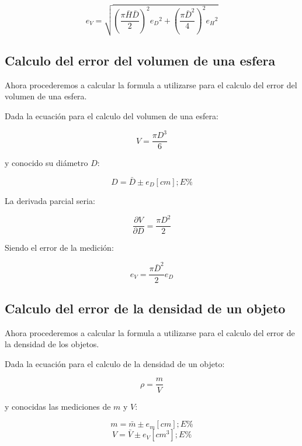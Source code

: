 \documentclass[letter,twoside,11pt]{article}
\begin{document}
\begin{equation}
    e_V = \sqrt{
        \left(\frac{\pi \bar{H} \bar{D}}{2}\right)^2 {e_D}^2 +
        \left(\frac{\pi \bar{D}^2}{4}\right)^2 {e_H}^2
    }
\end{equation}

\subsection{Calculo del error del volumen de una esfera}
Ahora procederemos a calcular la formula a utilizarse para el calculo del
error del volumen de una esfera.

Dada la ecuación para el calculo del volumen de una esfera:

\begin{equation}
    V = \frac{\pi D^3}{6}
\end{equation}

y conocido su diámetro $D$:

\begin{equation}
    D = \bar{D} \pm e_D [cm]; E\%
\end{equation}

La derivada parcial seria:

\begin{equation}
    \frac{\partial{V}}{\partial{D}} = \frac{\pi D^2}{2}
\end{equation}

Siendo el error de la medición:

\begin{equation}
    e_V = \frac{\pi \bar{D}^2}{2} e_D
\end{equation}

\subsection{Calculo del error de la densidad de un objeto}
Ahora procederemos a calcular la formula a utilizarse para el calculo del
error de la densidad de los objetos.

Dada la ecuación para el calculo de la densidad de un objeto:

\begin{equation}
    \rho = \frac{m}{V}
\end{equation}

y conocidas las mediciones de $m$ y $V$:

\begin{equation}
    m = \bar{m} \pm e_m [cm]; E\%
\end{equation}
\begin{equation}
    V = \bar{V} \pm e_V [cm^3]; E\%
\end{equation}
\end{document}
